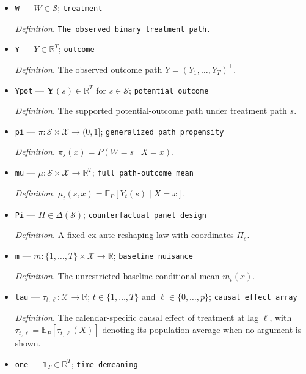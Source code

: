 \documentclass{article}
\begin{document}
\begin{itemize}
  \par\smallskip\noindent\emph{Definition.} \texttt{The unit-\allowbreak{}level pretreatment covariate vector.}
  \item \texttt{W} --- \(W\in\mathcal S\); \texttt{treatment}
  \par\smallskip\noindent\emph{Definition.} \texttt{The observed binary treatment path.}
  \item \texttt{Y} --- \(Y\in\mathbb R^{T}\); \texttt{outcome}
  \par\smallskip\noindent\emph{Definition.} The observed outcome path \(Y=(Y_1,\ldots,Y_T)^{\top}\).
  \item \texttt{Ypot} --- \(\mathbf Y(s)\in\mathbb R^{T}\) for \(s\in\mathcal S\); \texttt{potential outcome}
  \par\smallskip\noindent\emph{Definition.} The supported potential-outcome path under treatment path \(s\).
  \item \texttt{pi} --- \(\pi:\mathcal S\times\mathcal X\to(0,1]\); \texttt{generalized path propensity}
  \par\smallskip\noindent\emph{Definition.} \(\pi_s(x)=P(W=s\mid X=x)\).
  \item \texttt{mu} --- \(\mu:\mathcal S\times\mathcal X\to\mathbb R^{T}\); \texttt{full path-\allowbreak{}outcome mean}
  \par\smallskip\noindent\emph{Definition.} \(\mu_t(s,x)=\mathbb E_{P}[Y_t(s)\mid X=x]\).
  \item \texttt{Pi} --- \(\Pi\in\Delta(\mathcal S)\); \texttt{counterfactual panel design}
  \par\smallskip\noindent\emph{Definition.} A fixed ex ante reshaping law with coordinates \(\Pi_s\).
  \item \texttt{m} --- \(m:\{1,\ldots,T\}\times\mathcal X\to\mathbb R\); \texttt{baseline nuisance}
  \par\smallskip\noindent\emph{Definition.} The unrestricted baseline conditional mean \(m_t(x)\).
  \item \texttt{tau} --- \(\tau_{t,\ell}:\mathcal X\to\mathbb R\); \(t\in\{1,\ldots,T\}\) and \(\ell\in\{0,\ldots,p\}\); \texttt{causal effect array}
  \par\smallskip\noindent\emph{Definition.} The calendar-specific causal effect of treatment at lag \(\ell\), with \(\tau_{t,\ell}=\mathbb E_P[\tau_{t,\ell}(X)]\) denoting its population average when no argument is shown.
  \item \texttt{one} --- \(\mathbf 1_T\in\mathbb R^{T}\); \texttt{time demeaning}

\end{itemize}
\end{document}
